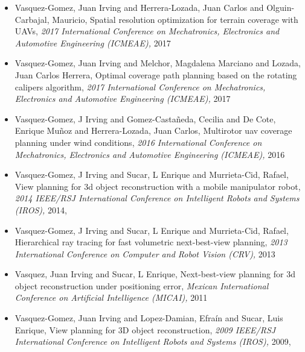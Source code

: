 \begin{itemize}
\item Vasquez-Gomez, Juan Irving and Herrera-Lozada, Juan Carlos and Olguin-Carbajal, Mauricio, Spatial resolution optimization for terrain coverage with UAVs, \textit{ 2017 International Conference on Mechatronics, Electronics and Automotive Engineering (ICMEAE),} 2017 
\item Vasquez-Gomez, Juan Irving and Melchor, Magdalena Marciano and Lozada, Juan Carlos Herrera, Optimal coverage path planning based on the rotating calipers algorithm, \textit{ 2017 International Conference on Mechatronics, Electronics and Automotive Engineering (ICMEAE),} 2017 
\item Vasquez-Gomez, J Irving and Gomez-Casta{\~n}eda, Cecilia and De Cote, Enrique Mu{\~n}oz and Herrera-Lozada, Juan Carlos, Multirotor uav coverage planning under wind conditions, \textit{ 2016 International Conference on Mechatronics, Electronics and Automotive Engineering (ICMEAE),} 2016 
\item Vasquez-Gomez, J Irving and Sucar, L Enrique and Murrieta-Cid, Rafael, View planning for 3d object reconstruction with a mobile manipulator robot, \textit{ 2014 IEEE/RSJ International Conference on Intelligent Robots and Systems (IROS),} 2014, \href{https://doi.org/10.1109/IROS.2014.6943158} {\faFilePdfO} 
\item Vasquez-Gomez, J Irving and Sucar, L Enrique and Murrieta-Cid, Rafael, Hierarchical ray tracing for fast volumetric next-best-view planning, \textit{ 2013 International Conference on Computer and Robot Vision (CRV),} 2013 
\item Vasquez, Juan Irving and Sucar, L Enrique, Next-best-view planning for 3d object reconstruction under positioning error, \textit{ Mexican International Conference on Artificial Intelligence (MICAI),} 2011 
\item Vasquez-Gomez, Juan Irving and Lopez-Damian, Efraín and Sucar, Luis Enrique, View planning for 3D object reconstruction, \textit{ 2009 IEEE/RSJ International Conference on Intelligent Robots and Systems (IROS),} 2009, \href{https://doi.org/10.1109/IROS.2009.5354383} {\faFilePdfO} 
\end{itemize} 
